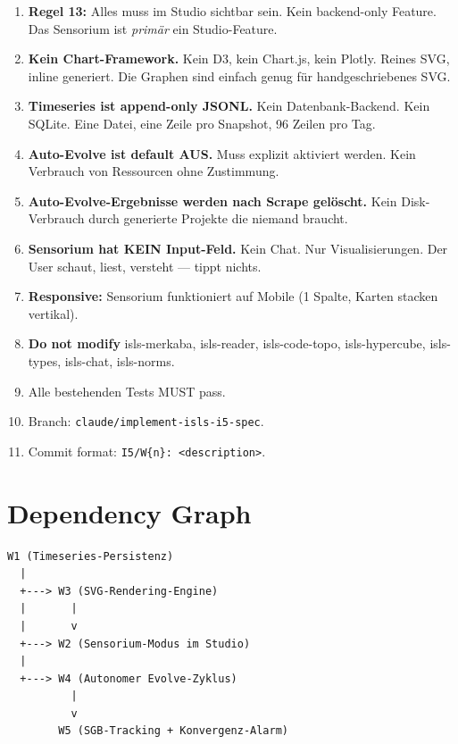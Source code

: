\documentclass[11pt,a4paper]{article}
\begin{document}
\begin{enumerate}
\item \textbf{Regel 13:} Alles muss im Studio sichtbar sein. 
      Kein backend-only Feature. Das Sensorium ist 
      \emph{prim\"ar} ein Studio-Feature.
\item \textbf{Kein Chart-Framework.} Kein D3, kein Chart.js, 
      kein Plotly. Reines SVG, inline generiert. Die Graphen 
      sind einfach genug f\"ur handgeschriebenes SVG.
\item \textbf{Timeseries ist append-only JSONL.} Kein 
      Datenbank-Backend. Kein SQLite. Eine Datei, eine 
      Zeile pro Snapshot, 96 Zeilen pro Tag.
\item \textbf{Auto-Evolve ist default AUS.} Muss explizit 
      aktiviert werden. Kein Verbrauch von Ressourcen 
      ohne Zustimmung.
\item \textbf{Auto-Evolve-Ergebnisse werden nach Scrape 
      gel\"oscht.} Kein Disk-Verbrauch durch generierte 
      Projekte die niemand braucht.
\item \textbf{Sensorium hat KEIN Input-Feld.} Kein Chat. 
      Nur Visualisierungen. Der User schaut, liest, 
      versteht --- tippt nichts.
\item \textbf{Responsive:} Sensorium funktioniert auf 
      Mobile (1 Spalte, Karten stacken vertikal).
\item \textbf{Do not modify} isls-merkaba, isls-reader, 
      isls-code-topo, isls-hypercube, isls-types, isls-chat, 
      isls-norms.
\item Alle bestehenden Tests MUST pass.
\item Branch: \texttt{claude/implement-isls-i5-spec}.
\item Commit format: \texttt{I5/W\{n\}: <description>}.
\end{enumerate}


\section{Dependency Graph}

\begin{verbatim}
W1 (Timeseries-Persistenz)
  |
  +---> W3 (SVG-Rendering-Engine)
  |       |
  |       v
  +---> W2 (Sensorium-Modus im Studio)
  |
  +---> W4 (Autonomer Evolve-Zyklus)
          |
          v
        W5 (SGB-Tracking + Konvergenz-Alarm)
\end{verbatim}
\end{document}

